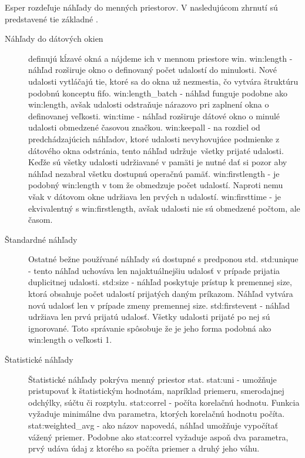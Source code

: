 		Esper rozdeľuje náhľady do menných priestorov. V nasledujúcom zhrnutí sú predstavené tie základné \cite{web:esper-doc}.
		\begin{description}
			\item[Náhľady do dátových okien] definujú kĺzavé okná a nájdeme ich v mennom priestore win.
				\subitem win:length - náhľad rozširuje okno o definovaný počet udalostí do minulosti. Nové udalosti vytláčajú tie, ktoré sa do okna už nezmestia, čo vytvára štruktúru podobnú konceptu fifo.
				\subitem win:length\_batch - náhľad funguje podobne ako win:length, avšak udalosti odstraňuje nárazovo pri zaplnení okna o definovanej veľkosti.
				\subitem win:time - náhľad rozširuje dátové okno o minulé udalosti obmedzené časovou značkou.
				\subitem win:keepall - na rozdiel od predchádzajúcich náhľadov, ktoré udalosti nevyhovujúce podmienke z dátového okna odstránia, tento náhľad udržuje\ všetky prijaté udalosti. Keďže sú všetky udalosti udržiavané v pamäti je nutné dať si pozor aby náhľad nezabral všetku dostupnú operačnú pamäť.
				\subitem win:firstlength - je podobný win:length v tom že obmedzuje počet udalostí. Naproti nemu však v dátovom okne udržiava len prvých n udalostí.
				\subitem win:firsttime - je ekvivalentný s win:firstlength, avšak udalosti nie sú obmedzené počtom, ale časom.

			\item[Štandardné náhľady] Ostatné bežne používané náhľady sú dostupné s predponou std.
				\subitem std:unique - tento náhľad uchováva len najaktuálnejšiu udalosť v prípade prijatia duplicitnej udalosti.
				\subitem std:size - náhľad poskytuje prístup k premennej size, ktorá obsahuje počet udalostí prijatých daným príkazom. Náhľad vytvára novú udalosť len v prípade zmeny premennej size. 
				\subitem std:firstevent - náhľad udržiava len prvú prijatú udalosť. Všetky udalosti prijaté po nej sú ignorované. Toto správanie spôsobuje že je jeho forma podobná ako win:length o veľkosti 1.

			\item[Štatistické náhľady] Štatistické náhľady pokrýva menný priestor stat.
				\subitem stat:uni - umožňuje pristupovať k štatistickým hodnotám, napríklad priemeru, smerodajnej odchýlky, súčtu či rozptylu.
				\subitem stat:correl - počíta korelačnú hodnotu. Funkcia vyžaduje minimálne dva parametra, ktorých korelačnú hodnotu počíta.
				\subitem stat:weighted\_avg - ako názov napovedá, náhľad umožňuje vypočítať vážený priemer. Podobne ako stat:correl vyžaduje aspoň dva parametra, prvý udáva údaj z ktorého sa počíta priemer a druhý jeho váhu.
		\end{description}
		
